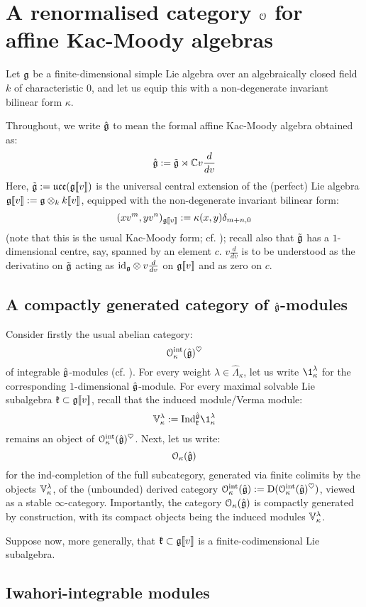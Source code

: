 \section{A renormalised category \texorpdfstring{$\mathcal{O}$}{} for affine Kac-Moody algebras}
    \begin{convention}
        Let $\mathfrak{g}$ be a finite-dimensional simple Lie algebra over an algebraically closed field $k$ of characteristic $0$, and let us equip this with a non-degenerate invariant bilinear form $\kappa$. 
    
        Throughout, we write $\hat{\mathfrak{g}}$ to mean the formal affine Kac-Moody algebra obtained as:
            $$\hat{\mathfrak{g}} := \tilde{\mathfrak{g}} \rtimes \mathbb{C} v \frac{d}{dv}$$
        Here, $\tilde{\mathfrak{g}} := \mathfrak{uce}( \mathfrak{g}[\![v]\!] )$ is the universal central extension of the (perfect) Lie algebra $\g[\![v]\!] := \g \tensor_k k[\![v]\!]$, equipped with the non-degenerate invariant bilinear form:
            $$(x v^m, y v^n)_{\mathfrak{g}[\![v]\!]} := \kappa(x, y) \delta_{m + n, 0}$$
        (note that this is the usual Kac-Moody form; cf. \cite[Chapters 2 and 7]{kac_infinite_dimensional_lie_algebras}); recall also that $\tilde{\mathfrak{g}}$ has a $1$-dimensional centre, say, spanned by an element $c$. $v \frac{d}{dv}$ is to be understood as the derivatino on $\tilde{\mathfrak{g}}$ acting as $\id_{\g} \tensor v \frac{d}{dv}$ on $\mathfrak{g}[\![v]\!]$ and as zero on $c$. 
    \end{convention}

    \subsection{A compactly generated category of \texorpdfstring{$\hat{\mathfrak{g}}$}{}-modules}
        Consider firstly the usual abelian category:
            $$\mathcal{O}_{\kappa}^{\mathrm{int}}(\hat{\mathfrak{g}})^{\heartsuit}$$
        of integrable $\hat{\mathfrak{g}}$-modules (cf. \cite[Chapter 9]{kac_infinite_dimensional_lie_algebras}). For every weight $\lambda \in \hat{\Lambda}_{\kappa}$, let us write $\1^{\lambda}_{\kappa}$ for the corresponding $1$-dimensional $\hat{\mathfrak{g}}$-module. For every maximal solvable Lie subalgebra $\mathfrak{k} \subset \mathfrak{g}[\![v]\!]$, recall that the induced module/Verma module:
            $$\V^{\lambda}_{\kappa} := \Ind_{\k}^{\hat{\g}} \1^{\lambda}_{\kappa}$$
        remains an object of $\mathcal{O}_{\kappa}^{\mathrm{int}}(\hat{\mathfrak{g}})^{\heartsuit}$. Next, let us write:
            $$\mathcal{O}_{\kappa}(\hat{\mathfrak{g}})$$
        for the ind-completion of the full subcategory, generated via finite colimits by the objects $\mathbb{V}^{\lambda}_{\kappa}$, of the (unbounded) derived category $\mathcal{O}_{\kappa}^{\mathrm{int}}(\hat{\mathfrak{g}}) := \mathrm{D}( \mathcal{O}_{\kappa}^{\mathrm{int}}(\hat{\mathfrak{g}})^{\heartsuit} )$, viewed as a stable $\infty$-category. Importantly, the category $\mathcal{O}_{\kappa}(\hat{\mathfrak{g}})$ is compactly generated by construction, with its compact objects being the induced modules $\mathbb{V}^{\lambda}_{\kappa}$. 

        Suppose now, more generally, that $\mathfrak{k} \subset \mathfrak{g}[\![v]\!]$ is a finite-codimensional Lie subalgebra.

    \subsection{Iwahori-integrable modules}